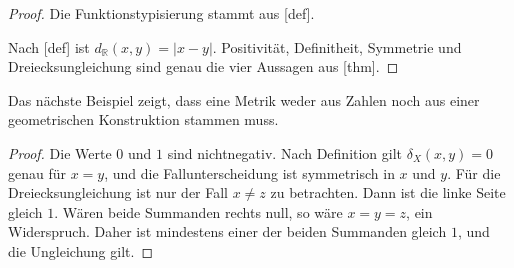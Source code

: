 \documentclass[main.tex]{subfiles}
\begin{document}

\begin{proof}
Die Funktionstypisierung stammt aus
[def].

Nach
[def] ist
\(d_{\mathbb R}(x,y)=|x-y|\). Positivität, Definitheit, Symmetrie und
Dreiecksungleichung sind genau die vier Aussagen aus
[thm].
\end{proof}

Das nächste Beispiel zeigt, dass eine Metrik weder aus Zahlen noch aus einer
geometrischen Konstruktion stammen muss.


\begin{proof}
Die Werte \(0\) und \(1\) sind nichtnegativ. Nach Definition gilt
\(\delta_X(x,y)=0\) genau für \(x=y\), und die Fallunterscheidung ist
symmetrisch in \(x\) und \(y\). Für die Dreiecksungleichung ist nur der Fall
\(x\neq z\) zu betrachten. Dann ist die linke Seite gleich \(1\). Wären
beide Summanden rechts null, so wäre \(x=y=z\), ein Widerspruch. Daher ist
mindestens einer der beiden Summanden gleich \(1\), und die Ungleichung gilt.
\end{proof}
\end{document}
